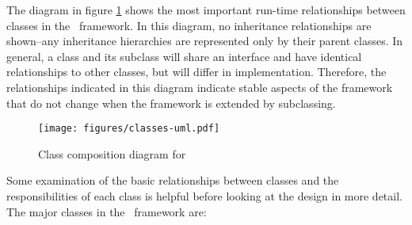 The diagram in figure \ref{classes-uml} shows the
most important run-time relationships between classes in the
\aicat\ framework.  In this diagram, no inheritance
relationships are shown--any inheritance hierarchies are represented
only by their parent classes.  In general, a class and its subclass
will share an interface and have identical relationships to other
classes, but will differ in implementation.  Therefore, the
relationships indicated in this diagram indicate stable aspects of the
framework that do not change when the framework is extended by
subclassing.

\begin{figure}
\texttt{[image: figures/classes-uml.pdf]}
\caption{Class composition diagram for \aicat}
\label{classes-uml}
\end{figure}

Some examination of the basic relationships between classes and the
responsibilities of each class is helpful before looking at the design
in more detail.  The major classes in the \aicat\ framework
are:

